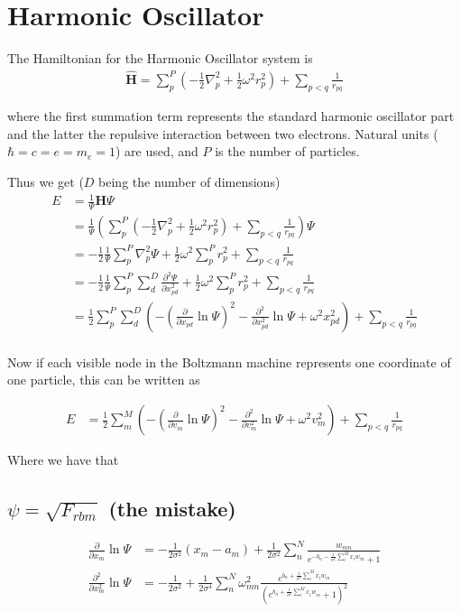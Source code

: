 \documentclass[norsk,a4paper,11pt]{article}
\begin{document}
\section{Harmonic Oscillator}
The Hamiltonian for the Harmonic Oscillator system is \cite{lectures2015}
\begin{align}
	\hat{\mathbf{H}} = \sum_p^P (-\frac{1}{2}\nabla_p^2 + \frac{1}{2}\omega^2 r_p^2 ) + \sum_{p<q} \frac{1}{r_{pq}}
\end{align}

where the first summation term represents the standard harmonic oscillator part and the latter the repulsive interaction between two electrons. Natural units ($\hbar=c=e=m_e=1$) are used, and $P$ is the number of particles.

Thus we get ($D$ being the number of dimensions)
\begin{align}
	E &= \frac{1}{\Psi} \mathbf{H} \Psi \\
	&= \frac{1}{\Psi} (\sum_p^P (-\frac{1}{2}\nabla_p^2 + \frac{1}{2}\omega^2 r_p^2 ) + \sum_{p<q} \frac{1}{r_{pq}}) \Psi \\
	&= -\frac{1}{2}\frac{1}{\Psi} \sum_p^P \nabla_p^2 \Psi 
	+ \frac{1}{2}\omega^2 \sum_p^P  r_p^2  + \sum_{p<q} \frac{1}{r_{pq}} \\
	&= -\frac{1}{2}\frac{1}{\Psi} \sum_p^P \sum_d^D \frac{\partial^2 \Psi}{\partial x_{pd}^2} + \frac{1}{2}\omega^2 \sum_p^P  r_p^2  + \sum_{p<q} \frac{1}{r_{pq}} \\
	&= \frac{1}{2} \sum_p^P \sum_d^D (-(\frac{\partial}{\partial x_{pd}} \ln\Psi)^2 -\frac{\partial^2}{\partial x_{pd}^2} \ln\Psi + \omega^2 x_{pd}^2)  + \sum_{p<q} \frac{1}{r_{pq}} \\
\end{align}

Now if each visible node in the Boltzmann machine represents one coordinate of one particle, this can be written as

\begin{align}
	E &=
	\frac{1}{2} \sum_m^M (-(\frac{\partial}{\partial v_m} \ln\Psi)^2 -\frac{\partial^2}{\partial v_m^2} \ln\Psi + \omega^2 v_m^2)  + \sum_{p<q} \frac{1}{r_{pq}}
\end{align}

Where we have that

\color{Green}
\subsection{$\psi = \sqrt{F_{rbm}}$ (the mistake)}
\color{Black}
\begin{align}
	\frac{\partial}{\partial x_m} \ln\Psi
	&= - \frac{1}{2\sigma^2}(x_m - a_m) + \frac{1}{2\sigma^2} \sum_n^N
 	\frac{w_{mn}}{e^{-b_n-\frac{1}{\sigma^2}\sum_i^M x_i w_{in}} + 1}
	\\
	\frac{\partial^2}{\partial x_m^2} \ln\Psi
	&= - \frac{1}{2\sigma^2} + \frac{1}{2\sigma^4}\sum_n^N \omega_{mn}^2 \frac{e^{b_n + \frac{1}{\sigma^2}\sum_i^M x_i w_{in}}}{(e^{b_n + \frac{1}{\sigma^2}\sum_i^M x_i w_{in}} + 1)^2}
\end{align}
\end{document}
